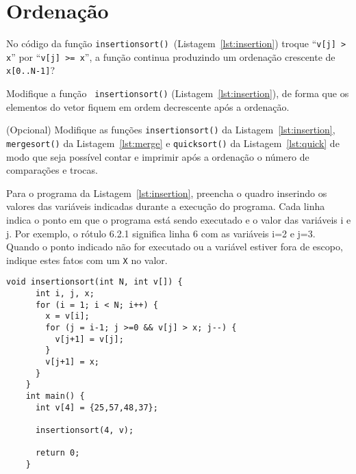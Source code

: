 \section*{Ordenação}

\exercise [Feofiloff] No código da função {\tt insertionsort()}~(Listagem~\ref{lst:insertion}) troque
``{\tt v[j] > x}'' por ``{\tt v[j] >= x}'', a função continua
produzindo um ordenação crescente de {\tt x[0..N-1]}?

\exercise [Feofiloff] Modifique a função {\tt
  insertionsort()} (Listagem~\ref{lst:insertion}), de forma que os elementos do vetor fiquem em ordem
decrescente após a ordenação.

\exercise (Opcional) Modifique as funções {\tt insertionsort()} da
Listagem~\ref{lst:insertion}, {\tt mergesort()} da
Listagem~\ref{lst:merge} e {\tt quicksort()} da
Listagem~\ref{lst:quick} de modo que seja possível contar e imprimir
após a ordenação o número de comparações e trocas.

\pagebreak

\exercise Para o programa da Listagem~\ref{lst:insertion}, preencha o
quadro inserindo os valores das variáveis indicadas durante a execução
do programa. Cada linha indica o ponto em que o programa está sendo
executado e o valor das variáveis i e j. Por exemplo, o rótulo {6.2.1}
significa linha 6 com as variáveis i=2 e j=3. Quando o ponto indicado
não for executado ou a variável estiver fora de escopo, indique estes
fatos com um {\tt X} no valor.\vspace{-0.5cm}

\begin{center}
  \begin{lstlisting}[caption={Algoritmo de ordenação por inserção.},label={lst:insertion}]
    void insertionsort(int N, int v[]) {
      int i, j, x;
      for (i = 1; i < N; i++) {
        x = v[i];
        for (j = i-1; j >=0 && v[j] > x; j--) {
          v[j+1] = v[j];
        }
        v[j+1] = x;
      }
    }
    int main() {
      int v[4] = {25,57,48,37};

      insertionsort(4, v);

      return 0;
    }
  \end{lstlisting}
\end{center}


